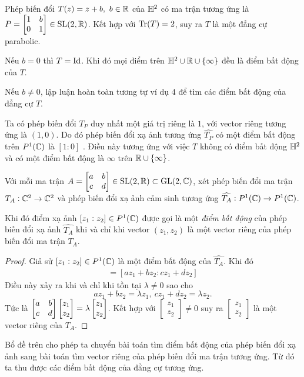 \begin{exam*}
     Phép biến đổi $T(z) = z+b,~b\in \mathbb{R}$ của $\mathbb{H}^2$ có ma trận tương ứng là $P = \begin{bmatrix}
    1 & b\\
    0 & 1
\end{bmatrix} \in \operatorname{SL}(2,\mathbb{R})$. Kết hợp với $\operatorname{Tr}(T)=2$, suy ra $T$ là một đẳng cự parabolic.

Nếu $b = 0$ thì $T = \operatorname{Id}$. Khi đó mọi điểm trên $\mathbb{H}^2 \cup \mathbb{R} \cup \{\infty\}$ đều là điểm bất động của $T$.

Nếu $b\neq 0$, lập luận hoàn toàn tương tự ví dụ $4$ để tìm các điểm bất động của đẳng cự $T$. 

Ta có phép biến đổi $T_P$ duy nhất một giá trị riêng là $1$, với vector riêng tương ứng là $(1,0)$. Do đó phép biến đổi xạ ảnh tương ứng $\widehat{T_P}$ có một điểm bất động trên $P^1(\mathbb{C})$ là $[1:0]$ . Điều này tương ứng với việc $T$ không có  điểm bất động $\mathbb{H}^2$ và có một điểm bất động là $\infty$ trên $\mathbb{R} \cup \{\infty\}$. 
\end{exam*}

\begin{lem}\label{lem fixed-point}
    Với mỗi ma trận $A = \begin{bmatrix} a & b \\ c & d \\ \end{bmatrix} \in \operatorname{SL}(2,\mathbb{R}) \subset \operatorname{GL}(2,\mathbb{C})$, xét phép biến đổi ma trận $T_A: \mathbb{C}^2 \to \mathbb{C}^2$ và phép biến đổi xạ ảnh cảm sinh tương ứng $\widehat{T_A}: P^1(\mathbb{C}) \to P^1(\mathbb{C})$. 
    
    Khi đó điểm xạ ảnh $[z_1:z_2] \in P^1(\mathbb{C})$ được gọi là một \textit{ điểm bất động} của phép biến đổi xạ ảnh $\widehat{T_A}$ khi và chỉ khi vector $(z_1,z_2)$ là một vector riêng của phép biến đổi ma trận $T_A$.
\end{lem}

\begin{proof}
    Giả sử $[z_1:z_2] \in P^1(\mathbb{C})$ là một điểm bất động của $\widehat{T_A}$. Khi đó 
    \begin{align*}
        [z_1:z_2] = [az_1+bz_2:cz_1+dz_2]
    \end{align*}
    Điều này xảy ra khi và chỉ khi tồn tại $\lambda \neq 0$ sao cho
    \[az_1+bz_2 = \lambda z_1,~cz_1+dz_2 = \lambda z_2.\]
    Tức là $\begin{bmatrix} a & b \\ c & d \\ \end{bmatrix} \begin{bmatrix}
        z_1\\z_2
    \end{bmatrix} = \lambda \begin{bmatrix}
        z_1\\z_2
    \end{bmatrix}$. Kết hợp với $\begin{bmatrix}
        z_1\\z_2
    \end{bmatrix} \neq 0$ suy ra $\begin{bmatrix}
        z_1\\z_2
    \end{bmatrix}$ là một vector riêng của $T_A$.
\end{proof}
    Bổ đề trên cho phép ta chuyển bài toán tìm điểm bất động của phép biến đổi xạ ảnh sang bài toán tìm vector riêng của phép biến đổi ma trận tương ứng. Từ đó ta thu được các điểm bất động của đẳng cự tương ứng.
